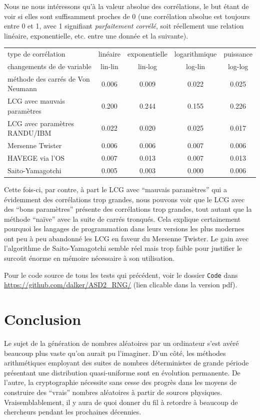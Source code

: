 \documentclass{scrartcl}
\begin{document}
Nous ne nous intéressons qu'à la valeur absolue des corrélations, le but étant
de voir si elles sont suffisamment proches de 0 (une corrélation absolue est
toujours entre 0 et 1, avec 1 signifiant \textit{parfaitement corrélé}, soit
réellement une relation linéaire, exponentielle, etc. entre une donnée et la
suivante).
\begin{center}
  \begin{tabular}{lcccc}
    type de corrélation & linéaire & exponentielle & logarithmique & puissance\\
    changements de de variable & lin-lin & lin-log & log-lin & log-log\\
    \hline
    méthode des carrés de Von Neumann&0.006&  0.009& 0.022&  0.025 \\
    LCG avec mauvais paramètres&  0.200&  0.244&  0.155&  0.226\\
    LCG avec paramètres RANDU/IBM&  0.022&  0.020&  0.025&  0.017\\
    Mersenne Twister& 0.006&  0.006&  0.007&  0.006\\
    HAVEGE via l'OS&  0.007&  0.013&  0.007&  0.013\\
    Saito-Yamagotchi& 0.005&  0.003&  0.000&  0.006
  \end{tabular}
\end{center}

Cette fois-ci, par contre, à part le LCG avec ``mauvais paramètres'' qui a
évidemment des corrélations trop grandes, nous pouvons voir que le LCG avec des
``bons paramètres'' présente des corrélations trop grandes, tout autant que la
méthode ``naïve'' avec la suite de carrés tronqués. Cela explique certainement
pourquoi les langages de programmation dans leurs versions les plus modernes
ont peu à peu abandonné les LCG en faveur du Mersenne Twister. Le gain avec
l'algorithme de Saito-Yamagotchi semble réel mais trop faible pour justifier le
surcoût énorme en mémoire nécessaire à son utilisation. 

Pour le code source de tous les tests qui précédent, voir le dossier
\texttt{Code} dans \url{https://github.com/dalker/ASD2_RNG/} (lien clicable dans
la version pdf).

\section{Conclusion}
Le sujet de la génération de nombres aléatoires par un ordinateur s'est avéré
beaucoup plus vaste qu'on aurait pu l'imaginer. D'un côté, les méthodes
arithmétiques employant des suites de nombres déterministes de grande période
présentant une distribution quasi-uniforme sont en évolution permanente. De
l'autre, la cryptographie nécessite sans cesse des progrès dans les moyens de
construire des ``vrais'' nombres aléatoires à partir de sources
physiques. Vraisemblablement, il y aura de quoi donner du fil à retordre à
beaucoup de chercheurs pendant les prochaines décennies.

\printbibliography
\end{document}
